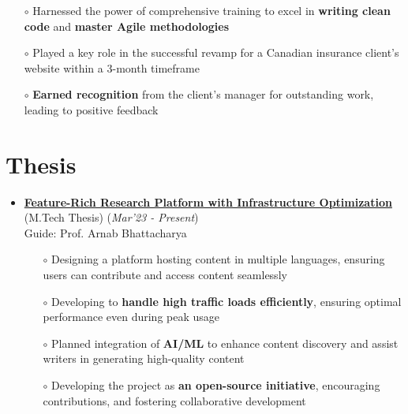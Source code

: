 \documentclass[10.8pt, a4paper]{extarticle}
\newcommand{\shorterSection}[1]{\vspace{-10pt}\section{#1}}
\begin{document}
\begin{itemize}
\begin{itemize}
          \item[$\circ$] Harnessed the power of comprehensive training to excel in \textbf{writing clean code} and \textbf{master Agile methodologies} \\[-0.6cm]
          \item[$\circ$] Played a key role in the successful revamp for a Canadian insurance client's website within a 3-month timeframe\\[-0.6cm]
          \item[$\circ$] \textbf{Earned recognition} from the client's manager for outstanding work, leading to positive feedback\\[-0.6cm]
    \end{itemize}
    \vspace{0.055cm}
\end{itemize}
\medskip

\shorterSection{Thesis}
\vspace{-2pt}
\begin{itemize}
  \item \href{~} {\textbf{Feature-Rich Research Platform with Infrastructure Optimization}} (M.Tech Thesis)  \hfill\hfill(\textit{Mar'23 - Present})\\Guide: Prof. Arnab Bhattacharya
  \begin{itemize}
    \item[$\circ$] Designing a platform hosting content in multiple languages, ensuring users can contribute and access content seamlessly\\[-0.6cm]
    \item[$\circ$] Developing to \textbf{handle high traffic loads efficiently}, ensuring optimal performance even during peak usage\\[-0.6cm]
    \item[$\circ$] Planned integration of \textbf{AI/ML} to enhance content discovery and assist writers in generating high-quality content \\[-0.6cm]
    \item[$\circ$] Developing the project as \textbf{an open-source initiative}, encouraging contributions, and fostering collaborative development \\[-0.6cm]
  \end{itemize}
  \vspace{0.055cm}
\end{itemize}
\medskip
\end{document}

